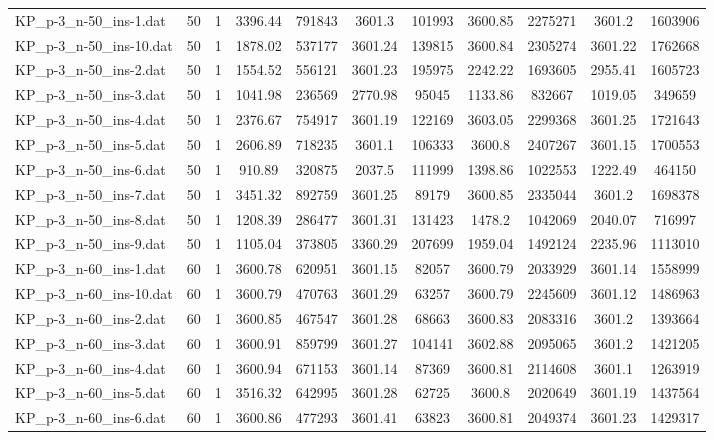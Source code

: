 \begin{table}[!ht]
\begin{tabular}{lcccccccccc}
KP\_p-3\_n-50\_ins-1.dat & 50 & 1 & 3396.44 & 791843 & 3601.3 & 101993 & 3600.85 & 2275271 & 3601.2 & 1603906 \\
KP\_p-3\_n-50\_ins-10.dat & 50 & 1 & 1878.02 & 537177 & 3601.24 & 139815 & 3600.84 & 2305274 & 3601.22 & 1762668 \\
KP\_p-3\_n-50\_ins-2.dat & 50 & 1 & 1554.52 & 556121 & 3601.23 & 195975 & 2242.22 & 1693605 & 2955.41 & 1605723 \\
KP\_p-3\_n-50\_ins-3.dat & 50 & 1 & 1041.98 & 236569 & 2770.98 & 95045 & 1133.86 & 832667 & 1019.05 & 349659 \\
KP\_p-3\_n-50\_ins-4.dat & 50 & 1 & 2376.67 & 754917 & 3601.19 & 122169 & 3603.05 & 2299368 & 3601.25 & 1721643 \\
KP\_p-3\_n-50\_ins-5.dat & 50 & 1 & 2606.89 & 718235 & 3601.1 & 106333 & 3600.8 & 2407267 & 3601.15 & 1700553 \\
KP\_p-3\_n-50\_ins-6.dat & 50 & 1 & 910.89 & 320875 & 2037.5 & 111999 & 1398.86 & 1022553 & 1222.49 & 464150 \\
KP\_p-3\_n-50\_ins-7.dat & 50 & 1 & 3451.32 & 892759 & 3601.25 & 89179 & 3600.85 & 2335044 & 3601.2 & 1698378 \\
KP\_p-3\_n-50\_ins-8.dat & 50 & 1 & 1208.39 & 286477 & 3601.31 & 131423 & 1478.2 & 1042069 & 2040.07 & 716997 \\
KP\_p-3\_n-50\_ins-9.dat & 50 & 1 & 1105.04 & 373805 & 3360.29 & 207699 & 1959.04 & 1492124 & 2235.96 & 1113010 \\
KP\_p-3\_n-60\_ins-1.dat & 60 & 1 & 3600.78 & 620951 & 3601.15 & 82057 & 3600.79 & 2033929 & 3601.14 & 1558999 \\
KP\_p-3\_n-60\_ins-10.dat & 60 & 1 & 3600.79 & 470763 & 3601.29 & 63257 & 3600.79 & 2245609 & 3601.12 & 1486963 \\
KP\_p-3\_n-60\_ins-2.dat & 60 & 1 & 3600.85 & 467547 & 3601.28 & 68663 & 3600.83 & 2083316 & 3601.2 & 1393664 \\
KP\_p-3\_n-60\_ins-3.dat & 60 & 1 & 3600.91 & 859799 & 3601.27 & 104141 & 3602.88 & 2095065 & 3601.2 & 1421205 \\
KP\_p-3\_n-60\_ins-4.dat & 60 & 1 & 3600.94 & 671153 & 3601.14 & 87369 & 3600.81 & 2114608 & 3601.1 & 1263919 \\
KP\_p-3\_n-60\_ins-5.dat & 60 & 1 & 3516.32 & 642995 & 3601.28 & 62725 & 3600.8 & 2020649 & 3601.19 & 1437564 \\
KP\_p-3\_n-60\_ins-6.dat & 60 & 1 & 3600.86 & 477293 & 3601.41 & 63823 & 3600.81 & 2049374 & 3601.23 & 1429317 \\

\end{tabular}
\end{table}

